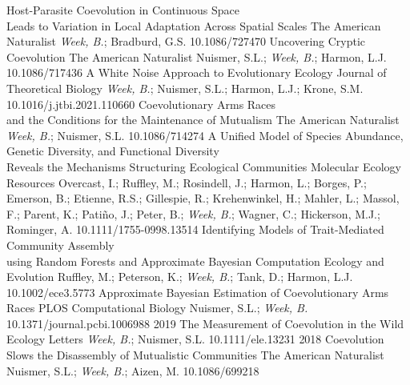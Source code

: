 \documentclass[9pt]{developercv} %
\begin{document}
\vspace{-5 pt}
\begin{publist}
		{Host-Parasite Coevolution in Continuous Space\\ Leads to Variation in Local Adaptation Across Spatial Scales}
		{The American Naturalist}
		{\emph{Week, B.}; Bradburd, G.S.}
        {10.1086/727470}
		{Uncovering Cryptic Coevolution}
		{The American Naturalist}
		{Nuismer, S.L.; \emph{Week, B.}; Harmon, L.J.}
        {10.1086/717436}
		{A White Noise Approach to Evolutionary Ecology}
		{Journal of Theoretical Biology}
		{\emph{Week, B.}; Nuismer, S.L.; Harmon, L.J.; Krone, S.M.}
        {10.1016/j.jtbi.2021.110660}
		{Coevolutionary Arms Races\\ and the Conditions for the Maintenance of Mutualism}
		{The American Naturalist}
		{\emph{Week, B.}; Nuismer, S.L.}
        {10.1086/714274}
        {A Unified Model of Species Abundance, Genetic Diversity, and Functional Diversity\\ Reveals the Mechanisms Structuring Ecological Communities}
        {Molecular Ecology Resources}
        {Overcast, I.; Ruffley, M.; Rosindell, J.; Harmon, L.; Borges, P.; Emerson, B.; Etienne, R.S.; Gillespie,
        R.; Krehenwinkel, H.; Mahler, L.; Massol, F.; Parent, K.; Patiño, J.; Peter, B.; \emph{Week, B.}; Wagner,
        C.; Hickerson, M.J.; Rominger, A.}
        {10.1111/1755-0998.13514}
        {Identifying Models of Trait-Mediated Community Assembly\\ using Random Forests and Approximate Bayesian Computation}
        {Ecology and Evolution}
        {Ruffley, M.; Peterson, K.; \emph{Week, B.}; Tank, D.; Harmon, L.J.}
        {10.1002/ece3.5773}
        {Approximate Bayesian Estimation of Coevolutionary Arms Races}
        {PLOS Computational Biology}
        {Nuismer, S.L.; \emph{Week, B.}}
        {10.1371/journal.pcbi.1006988}
    \pub
    {2019}
    {The Measurement of Coevolution in the Wild}
    {Ecology Letters}
    {\emph{Week, B.}; Nuismer, S.L.}
    {10.1111/ele.13231}
    \pub
    {2018}
    {Coevolution Slows the Disassembly of Mutualistic Communities}
    {The American Naturalist}
    {Nuismer, S.L.; \emph{Week, B.}; Aizen, M.}
    {10.1086/699218}
\end{publist}
\end{document}
